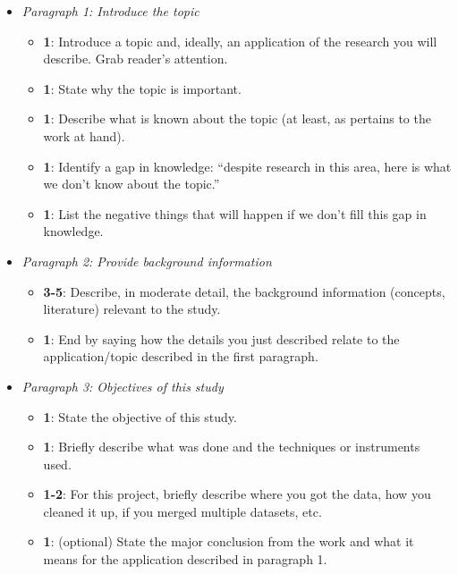 \documentclass[
]{krantz}
\providecommand{\tightlist}{%
  \setlength{\itemsep}{0pt}\setlength{\parskip}{0pt}}
\begin{document}
\begin{itemize}
\tightlist
\item
  \emph{Paragraph 1: Introduce the topic}

  \begin{itemize}
  \tightlist
  \item
    \textbf{1}: Introduce a topic and, ideally, an application of the research you will describe. Grab reader's attention.
  \item
    \textbf{1}: State why the topic is important.
  \item
    \textbf{1}: Describe what is known about the topic (at least, as pertains to the work at hand).
  \item
    \textbf{1}: Identify a gap in knowledge: ``despite research in this area, here is what we don't know about the topic.''
  \item
    \textbf{1}: List the negative things that will happen if we don't fill this gap in knowledge.
  \end{itemize}
\item
  \emph{Paragraph 2: Provide background information}

  \begin{itemize}
  \tightlist
  \item
    \textbf{3-5}: Describe, in moderate detail, the background information (concepts, literature) relevant to the study.
  \item
    \textbf{1}: End by saying how the details you just described relate to the application/topic described in the first paragraph.
  \end{itemize}
\item
  \emph{Paragraph 3: Objectives of this study}

  \begin{itemize}
  \tightlist
  \item
    \textbf{1}: State the objective of this study.
  \item
    \textbf{1}: Briefly describe what was done and the techniques or instruments used.
  \item
    \textbf{1-2}: For this project, briefly describe where you got the data, how you cleaned it up, if you merged multiple datasets, etc.
  \item
    \textbf{1}: (optional) State the major conclusion from the work and what it means for the application described in paragraph 1.
  \end{itemize}
\end{itemize}
\end{document}

